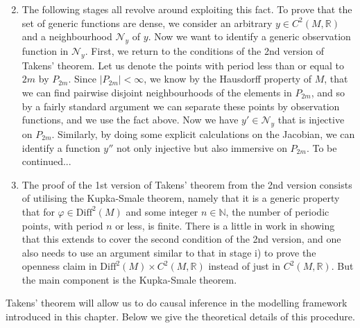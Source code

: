 \documentclass[11pt, a4paper]{memoir}
\theoremstyle{plain}
\theoremstyle{definition}
\newcommand{\mN}{\mathbb{N}}
\newcommand{\mR}{\mathbb{R}}
\begin{document}
\begin{enumerate}[label=\roman*)]
	\setcounter{enumi}{1}
	\item The following stages all revolve around exploiting this fact. To prove that the set of generic functions are dense, we consider an arbitrary $y\in C^2(M,\mR)$ and a neighbourhood $\mathcal{N}_y$ of $y$. Now we want to identify a generic observation function in $\mathcal{N}_y$. First, we return to the conditions of the 2nd version of Takens' theorem. Let us denote the points with period less than or equal to $2m$ by $P_{2m}$. Since $|P_{2m}|<\infty$, we know by the Hausdorff property of $M$, that we can find pairwise disjoint neighbourhoods of the elements in $P_{2m}$, and so by a fairly standard argument we can separate these points by observation functions, and we use the fact above. Now we have $y'\in\mathcal{N}_y$ that is injective on $P_{2m}$. Similarly, by doing some explicit calculations on the Jacobian, we can identify a function $y''$ not only injective but also immersive on $P_{2m}$. To be continued...
	\item The proof of the 1st version of Takens' theorem from the 2nd version consists of utilising the Kupka-Smale theorem, namely that it is a generic property that for $\varphi\in \text{Diff}^2(M)$ and some integer $n\in \mN$, the number of periodic points, with period $n$ or less, is finite. There is a little in work in showing that this extends to cover the second condition of the 2nd version, and one also needs to use an argument similar to that in stage i) to prove the openness claim in $\text{Diff}^2(M)\times C^2(M,\mR)$ instead of just in $C^2(M,\mR)$. But the main component is the Kupka-Smale theorem.
\end{enumerate}  
Takens' theorem will allow us to do causal inference in the modelling framework introduced in this chapter. Below we give the theoretical details of this procedure.
\end{document}
